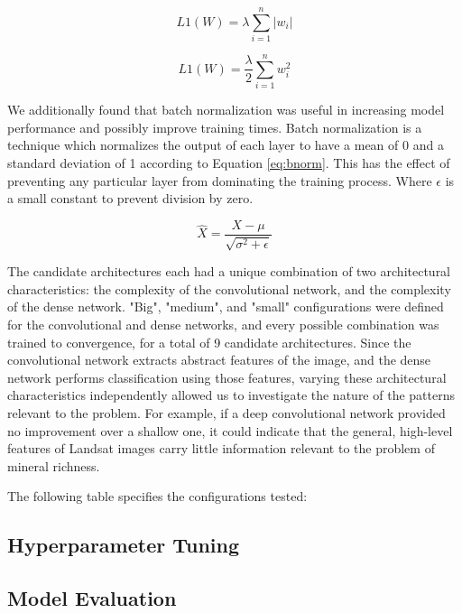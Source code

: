 \documentclass[10pt]{article}
\begin{document}
\begin{equation}\label{eq:l1}
L1(W) = \lambda\sum_{i=1}^n |w_i| 
\end{equation}

\begin{equation}\label{eq:l2}
  L1(W) = \frac{\lambda}{2}\sum_{i=1}^n w_i^2
\end{equation}

We additionally found that batch normalization was useful in increasing model performance and
possibly improve training times. Batch normalization is a technique which normalizes the
output of each layer to have a mean of 0 and a standard deviation of 1 according to
Equation \ref{eq:bnorm}. This has the effect of preventing any particular layer from
dominating the training process. Where $\epsilon$ is a small constant to prevent
division by zero.

\begin{equation}\label{eq:bnorm}
  \hat{X} = \frac{X - \mu}{\sqrt{\sigma^2 + \epsilon}}
\end{equation}


The candidate architectures each had a unique combination of two architectural
characteristics: the complexity of the convolutional network, and the complexity
of the dense network. "Big", "medium", and "small" configurations were defined
for the convolutional and dense networks, and every possible combination was
trained to convergence, for a total of 9 candidate architectures. Since the
convolutional network extracts abstract features of the image, and the dense
network performs classification using those features, varying these architectural characteristics
independently allowed us to investigate the nature of the patterns relevant
to the problem. For example, if a deep convolutional network provided no
improvement over a shallow one, it could indicate that the general,
high-level features of Landsat images carry little information relevant
to the problem of mineral richness.

The following table specifies the configurations tested:


\subsection{Hyperparameter Tuning}



\subsection{Model Evaluation}
\end{document}
